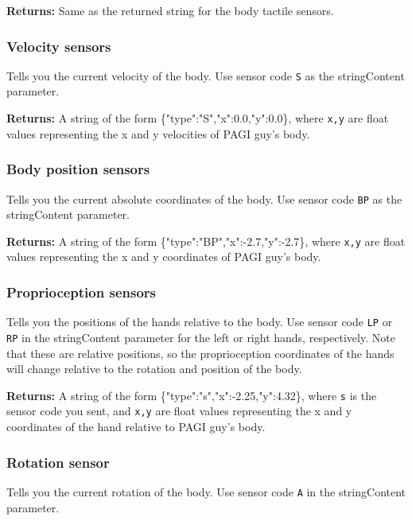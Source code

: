 \noindent \textbf{Returns:} Same as the returned string for the body tactile sensors.

\subsubsection{Velocity sensors}

Tells you the current velocity of the body. Use sensor code \texttt{S} as the stringContent parameter.

\noindent \textbf{Returns:}	 A string of the form \scriptsize{\{"type":"S","x":0.0,"y":0.0\}},
{\normalsize where \texttt{x,y} are float values representing the x and y velocities of PAGI guy's body.}

\subsubsection{Body position sensors}
\normalsize
Tells you the current absolute coordinates of the body. Use sensor code \texttt{BP} as the stringContent parameter.

\noindent \textbf{Returns:} A string of the form \scriptsize{\{"type":"BP","x":-2.7,"y":-2.7\}}, \normalsize where \texttt{x,y} are float values representing the x and y coordinates of PAGI guy's body.

\subsubsection{Proprioception sensors}

Tells you the positions of the hands relative to the body. Use sensor code \texttt{LP} or \texttt{RP} in the stringContent parameter for the left or right hands, respectively. Note that these are relative positions, so the proprioception coordinates of the hands will change relative to the rotation and position of the body.

\noindent \textbf{Returns:} A string of the form \scriptsize{\{"type":"s","x":-2.25,"y":4.32\}}, \normalsize where \texttt{s} is the sensor code you sent, and \texttt{x,y} are float values representing the x and y coordinates of the hand relative to PAGI guy's body.

\subsubsection{Rotation sensor}
\normalsize
Tells you the current rotation of the body. Use sensor code \texttt{A} in the stringContent parameter.

